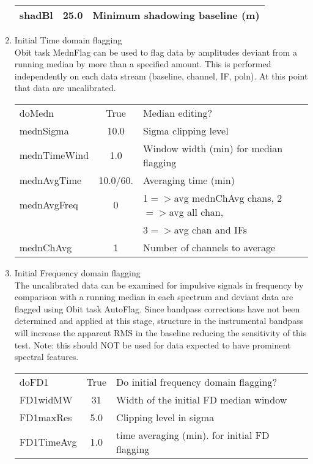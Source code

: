 \documentclass[11pt]{article}
\begin{document}
\begin{enumerate}
\begin{center}
\begin{tabular}{|l|c|l|}
shadBl  & 25.0 &  Minimum shadowing baseline (m)\\
\hline
\end{tabular}
\end{center}
%
\item Initial Time domain flagging\\
Obit task MednFlag can be used to flag data by amplitudes deviant from
a running median by more than a specified amount.
This is performed independently on each data stream (baseline,
channel, IF, poln).
At this point that data are uncalibrated.
\begin{center}
\begin{tabular}{|l|c|l|}
\hline
doMedn       & True & Median editing? \\
mednSigma    & 10.0 &  Sigma clipping level\\
mednTimeWind & 1.0  &  Window width (min) for median flagging\\
mednAvgTime  & 10.0/60. & Averaging time (min) \\
mednAvgFreq  & 0    &  1$=>$avg mednChAvg chans, 2$=>$avg all chan,\\
 & & 3$=>$avg chan and IFs\\
mednChAvg    & 1    &  Number of channels to average\\
\hline
\end{tabular}
\end{center}
%
\item Initial Frequency domain flagging\\
The uncalibrated data can be examined for impulsive signals in
frequency by comparison with a running median in each spectrum and
deviant data are flagged using Obit task AutoFlag.
Since bandpass corrections have not been determined and applied at
this stage, structure in the instrumental bandpass will increase the
apparent RMS in the baseline reducing the sensitivity of this test.
Note: this should NOT be used for data expected to have prominent
spectral features.
\begin{center}
\begin{tabular}{|l|c|l|}
\hline
doFD1       & True &  Do initial frequency domain flagging?\\
FD1widMW    & 31   &  Width of the initial FD median window\\
FD1maxRes   & 5.0  &  Clipping level in sigma \\
FD1TimeAvg  & 1.0  &  time averaging (min). for initial FD flagging\\
\hline
\end{tabular}

\end{center}
\end{enumerate}
\end{document}
